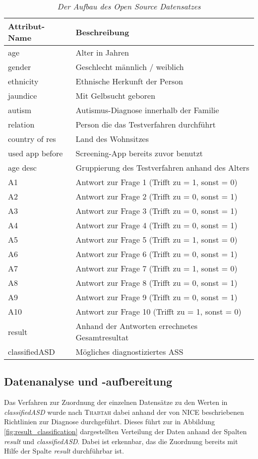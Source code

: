 \begin{table}[htbp]
\begin{tabular}{l p{6cm}}
\textbf{Attribut-Name} & \textbf{Beschreibung}\\ \hline
age & Alter in Jahren\\
gender & Geschlecht männlich / weiblich\\
ethnicity & Ethnische Herkunft der Person\\
jaundice	 & Mit Gelbsucht geboren\\
autism & Autismus-Diagnose innerhalb der Familie\\
relation & Person die das Testverfahren durchführt\\
country of res & Land des Wohnsitzes  \\
used app before & Screening-App bereits zuvor benutzt\\
age desc & Gruppierung des Testverfahren anhand des Alters\\
A1 & Antwort zur Frage 1 (Trifft zu = 1, sonst = 0)\\
A2 & Antwort zur Frage 2 (Trifft zu = 0, sonst = 1)\\
A3 & Antwort zur Frage 3 (Trifft zu = 0, sonst = 1)\\
A4 & Antwort zur Frage 4 (Trifft zu = 0, sonst = 1)\\
A5 & Antwort zur Frage 5 (Trifft zu = 1, sonst = 0)\\
A6 & Antwort zur Frage 6 (Trifft zu = 0, sonst = 1)\\
A7 & Antwort zur Frage 7 (Trifft zu = 1, sonst = 0)\\
A8 & Antwort zur Frage 8 (Trifft zu = 0, sonst = 1)\\
A9 & Antwort zur Frage 9 (Trifft zu = 0, sonst = 1)\\
A10 & Antwort zur Frage 10 (Trifft zu = 1, sonst = 0)\\
result & Anhand der Antworten errechnetes Gesamtresultat\\
classifiedASD & Mögliches diagnostiziertes ASS\\
\end{tabular}
\centering
\caption{\em Der Aufbau des Open Source Datensatzes}
\label{tbl:datensatz}
\end{table}

\subsection{Datenanalyse und -aufbereitung} \label{sec:analysis}
Das Verfahren zur Zuordnung der einzelnen Datensätze zu den Werten in \textit{classifiedASD} wurde nach \textsc{Thabtah} \cite{Thabtah2017} dabei anhand der von \textsc{NICE} \cite{NICE2012} beschriebenen Richtlinien zur Diagnose durchgeführt. Dieses führt zur in Abbildung \ref{fig:result_classification} dargestellten Verteilung der Daten anhand der Spalten \textit{result} und \textit{classifiedASD}. Dabei ist erkennbar, das die Zuordnung bereits mit Hilfe der Spalte \textit{result} durchführbar ist.

